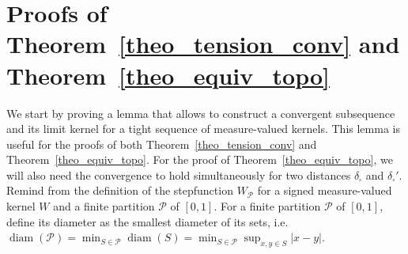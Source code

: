 \documentclass{amsart}
\newcommand{\ie}{i.e.\ }
\theoremstyle{plain}
\theoremstyle{definition}
\newcommand{\cP}{\mathcal{P}}
\newcommand{\dd}{\delta_{\square}}
\newcommand{\ddPrime}{\delta_{\square}'}
\DeclareMathOperator{\diam}{diam}
\begin{document}
\section{Proofs of Theorem~\ref{theo_tension_conv} and Theorem~\ref{theo_equiv_topo}}
	\label{section_proof_theo_tension_conv}

We start by proving a lemma that allows to construct 
a convergent subsequence and its limit kernel
for a tight sequence of measure-valued kernels.
This lemma is useful for the proofs of both 
Theorem~\ref{theo_tension_conv} and Theorem~\ref{theo_equiv_topo}.
For the proof of Theorem~\ref{theo_equiv_topo},
we will also need the convergence to hold simultaneously 
for two distances $\dd$ and $\ddPrime$.
Remind from  the definition of the stepfunction $W_{\cP}$
for a signed measure-valued kernel $W$ and a finite partition $\cP$ of $[0,1]$.
For a finite partition $\cP$ of $[0,1]$, define its diameter as the smallest diameter of its sets,
\ie $\diam(\cP) = \min_{S\in\cP} \diam(S) = \min_{S\in\cP} \sup_{x,y\in S} \vert x-y \vert$.
\end{document}
